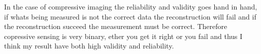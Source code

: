 In the case of compressive imaging the reliability and validity goes hand in hand, if whats being measured is not the correct data the reconstruction will fail and if the reconstruction succeed the measurement must be correct. Therefore copressive sensing is very binary, ether you get it right or you fail and thus I think my result have both high validity and reliability.  

 






